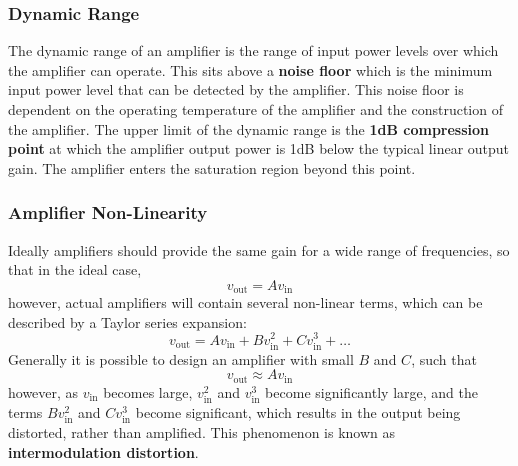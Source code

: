\documentclass{article}
\begin{document}
\subsubsection{Dynamic Range}
The dynamic range of an amplifier is the range of input power levels
over which the amplifier can operate. This sits above a \textbf{noise
floor} which is the minimum input power level that can be detected by
the amplifier. This noise floor is dependent on the operating
temperature of the amplifier and the construction of the amplifier. The
upper limit of the dynamic range is the \textbf{1dB compression point}
at which the amplifier output power is 1dB below the typical linear
output gain. The amplifier enters the saturation region beyond this
point.
\subsubsection{Amplifier Non-Linearity}
Ideally amplifiers should provide the same gain for a wide range of
frequencies, so that in the ideal case,
\begin{equation*}
    v_{\mathrm{out}} = A v_{\mathrm{in}}
\end{equation*}
however, actual amplifiers will contain several non-linear terms, which
can be described by a Taylor series expansion:
\begin{equation*}
    v_{\mathrm{out}} = A v_{\mathrm{in}} + B v_{\mathrm{in}}^2 + C v_{\mathrm{in}}^3 + \ldots
\end{equation*}
Generally it is possible to design an amplifier with small \(B\) and
\(C\), such that
\begin{equation*}
    v_{\mathrm{out}} \approx A v_{\mathrm{in}}
\end{equation*}
however, as \(v_{\mathrm{in}}\) becomes large, \(v_{\mathrm{in}}^2\) and \(v_{\mathrm{in}}^3\) become
significantly large, and the terms \(B v_{\mathrm{in}}^2\) and \(C v_{\mathrm{in}}^3\) become
significant, which results in the output being distorted, rather than
amplified. This phenomenon is known as \textbf{intermodulation distortion}.
\end{document}
